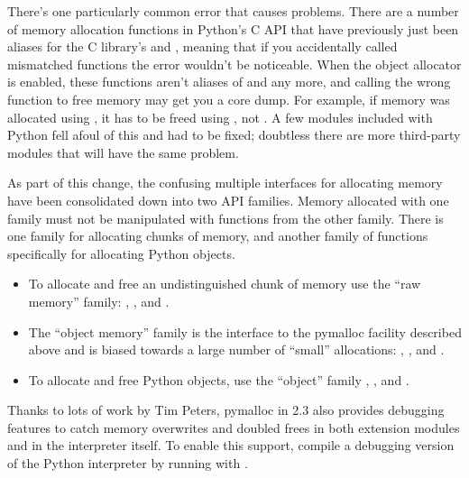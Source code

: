 \documentclass{howto}
\begin{document}
There's one particularly common error that causes problems.  There are
a number of memory allocation functions in Python's C API that have
previously just been aliases for the C library's 
and , meaning that if you accidentally called
mismatched functions the error wouldn't be noticeable.  When the
object allocator is enabled, these functions aren't aliases of
 and  any more, and calling the
wrong function to free memory may get you a core dump.  For example,
if memory was allocated using , it has to
be freed using , not .  A
few modules included with Python fell afoul of this and had to be
fixed; doubtless there are more third-party modules that will have the
same problem.

As part of this change, the confusing multiple interfaces for
allocating memory have been consolidated down into two API families.
Memory allocated with one family must not be manipulated with
functions from the other family.  There is one family for allocating
chunks of memory, and another family of functions specifically for
allocating Python objects.

\begin{itemize}
  \item To allocate and free an undistinguished chunk of memory use
  the ``raw memory'' family: ,
  , and .

  \item The ``object memory'' family is the interface to the pymalloc
  facility described above and is biased towards a large number of
  ``small'' allocations: ,
  , and .

  \item To allocate and free Python objects, use the ``object'' family
  , , and
  .
\end{itemize}

Thanks to lots of work by Tim Peters, pymalloc in 2.3 also provides
debugging features to catch memory overwrites and doubled frees in
both extension modules and in the interpreter itself.  To enable this
support, compile a debugging version of the Python interpreter by
running  with .
\end{document}
